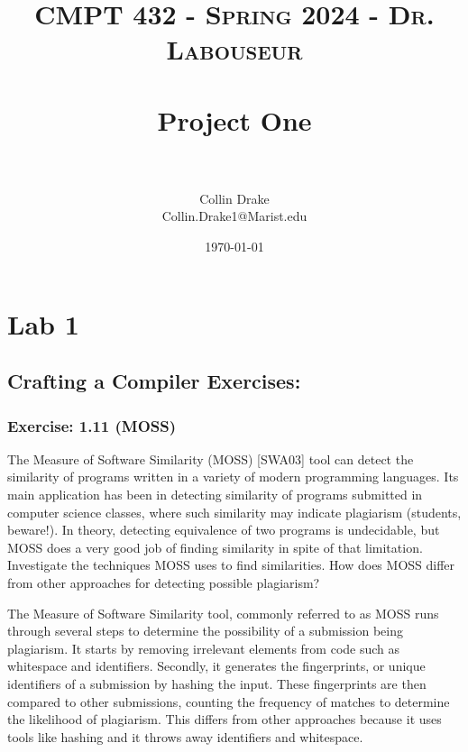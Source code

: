 \documentclass[letterpaper, 10pt,DIV=13]{scrartcl}
\title{	
   \normalfont \normalsize 
   \textsc{CMPT 432 - Spring 2024 - Dr. Labouseur} \\[10pt] %
   \horrule{0.5pt} \\[0.25cm] 	%
   \huge Project One  \\     	    %
   \horrule{0.5pt} \\[0.25cm] 	%
}
\author{Collin Drake \\ \normalsize Collin.Drake1@Marist.edu}
\date{\normalsize\today} 	%
\numberwithin{equation}{section} %
\numberwithin{figure}{section} %
\numberwithin{table}{section} %
\begin{document}
\maketitle %

\section*{Lab 1}

\subsection*{Crafting a Compiler Exercises:}

\subsubsection*{Exercise: 1.11 (MOSS)}
    The Measure of Software Similarity (MOSS) [SWA03] tool can detect the similarity of programs written in a variety of modern programming languages. Its main application has been in detecting similarity of programs submitted in computer science classes, where such similarity may indicate plagiarism (students, beware!). In theory, detecting equivalence of two programs is undecidable, but MOSS does a very good job of finding similarity in spite of that limitation.
    Investigate the techniques MOSS uses to find similarities. How does MOSS differ from other approaches for detecting possible plagiarism?

    The Measure of Software Similarity tool, commonly referred to as MOSS runs through several steps to determine the possibility of a submission being plagiarism. It starts by removing irrelevant elements from code such as whitespace and identifiers. Secondly, it generates the fingerprints, or unique identifiers of a submission by hashing the input. These fingerprints are then compared to other submissions, counting the frequency of matches to determine the likelihood of plagiarism. This differs from other approaches because it uses tools like hashing and it throws away identifiers and whitespace.
\end{document}
